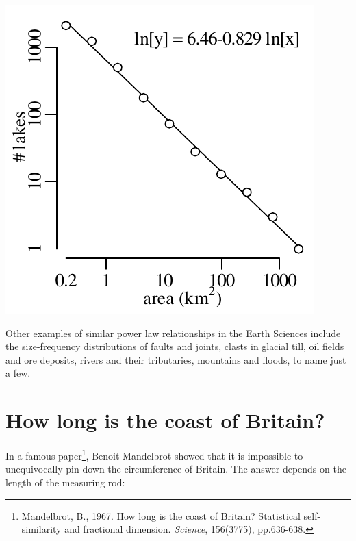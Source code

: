 \noindent\begin{minipage}[t][][b]{.3\textwidth}
  \includegraphics[width=\textwidth]{../figures/Finland.pdf}
\end{minipage}
\begin{minipage}[t][][t]{.7\textwidth}
  \label{fig:Finlandpowerlaw}
\end{minipage}

Other examples of similar power law relationships in the Earth
Sciences include the size-frequency distributions of faults and
joints, clasts in glacial till, oil fields and ore deposits, rivers
and their tributaries, mountains and floods, to name just a few.

\section{How long is the coast of Britain?}
\label{sec:britain}

In a famous paper\footnote{Mandelbrot, B., 1967. How long is the coast
  of Britain? Statistical self-similarity and fractional
  dimension. \textit{Science}, 156(3775), pp.636-638.}, Benoit
Mandelbrot showed that it is impossible to unequivocally pin down the
circumference of Britain. The answer depends on the length of the
measuring rod:\medskip

